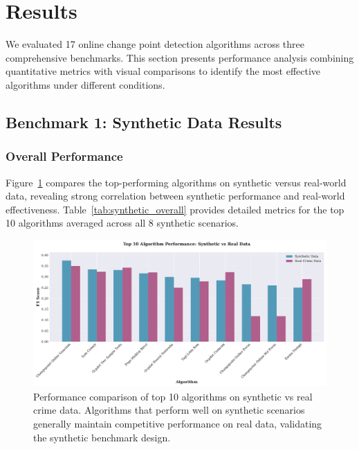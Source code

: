 \section{Results}
\label{sec:results}

We evaluated 17 online change point detection algorithms across three comprehensive benchmarks. This section presents performance analysis combining quantitative metrics with visual comparisons to identify the most effective algorithms under different conditions.

\subsection{Benchmark 1: Synthetic Data Results}
\label{sec:results_synthetic}

\subsubsection{Overall Performance}

Figure~\ref{fig:top_algorithms} compares the top-performing algorithms on synthetic versus real-world data, revealing strong correlation between synthetic performance and real-world effectiveness. Table~\ref{tab:synthetic_overall} provides detailed metrics for the top 10 algorithms averaged across all 8 synthetic scenarios.

\begin{figure}[H]
\centering
\includegraphics[width=\textwidth]{figures/fig_top_algorithms_comparison.pdf}
\caption{Performance comparison of top 10 algorithms on synthetic vs real crime data. Algorithms that perform well on synthetic scenarios generally maintain competitive performance on real data, validating the synthetic benchmark design.}
\label{fig:top_algorithms}
\end{figure}

